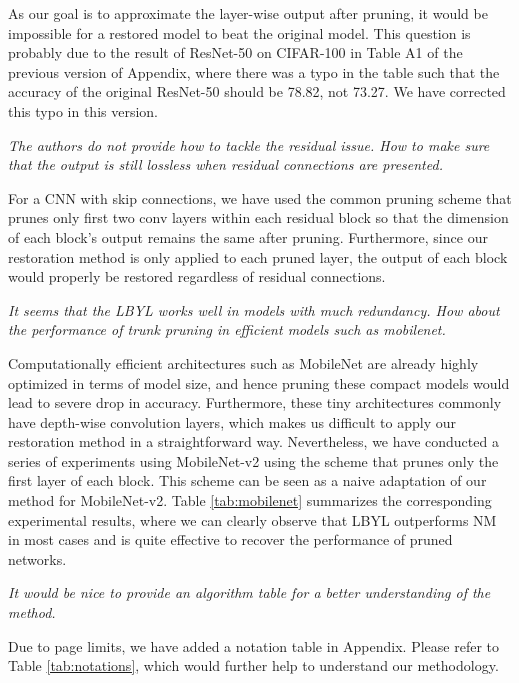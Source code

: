 As our goal is to approximate the layer-wise output after pruning, it would be impossible for a restored model to beat the original model. This question is probably due to the result of ResNet-50 on CIFAR-100 in Table A1 of the previous version of Appendix, where there was a typo in the table such that the accuracy of the original ResNet-50 should be 78.82, not 73.27. We have corrected this typo in this version.

\textit{The authors do not provide how to tackle the residual issue. How to make sure that the output is still lossless when residual connections are presented.}

For a CNN with skip connections, we have used the common pruning scheme that prunes only first two conv layers within each residual block so that the dimension of each block's output remains the same after pruning. Furthermore, since our restoration method is only applied to each pruned layer, the output of each block would properly be restored regardless of residual connections.


\textit{It seems that the LBYL works well in models with much redundancy. How about the performance of trunk pruning in efficient models such as mobilenet.}

Computationally efficient architectures such as MobileNet are already highly optimized in terms of model size, and hence pruning these compact models would lead to severe drop in accuracy. Furthermore, these tiny architectures commonly have depth-wise convolution layers, which makes us difficult to apply our restoration method in a straightforward way. Nevertheless, we have conducted a series of experiments using MobileNet-v2 using the scheme that prunes only the first layer of each block. This scheme can be seen as a naive adaptation of our method for MobileNet-v2. Table \ref{tab:mobilenet} summarizes the corresponding experimental results, where we can clearly observe that LBYL outperforms NM in most cases and is quite effective to recover the performance of pruned networks.


\textit{It would be nice to provide an algorithm table for a better understanding of the method.}

Due to page limits, we have added a notation table in Appendix. Please refer to Table \ref{tab:notations}, which would further help to understand our methodology.



